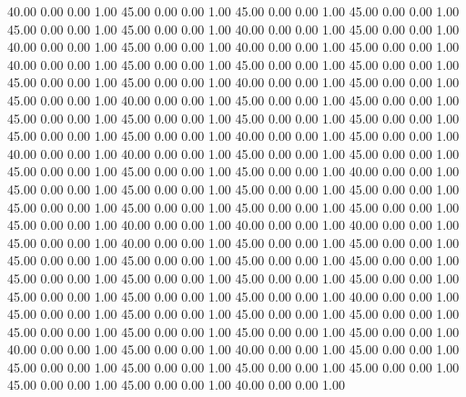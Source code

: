    40.00   0.00   0.00   1.00
   45.00   0.00   0.00   1.00
   45.00   0.00   0.00   1.00
   45.00   0.00   0.00   1.00
   45.00   0.00   0.00   1.00
   45.00   0.00   0.00   1.00
   40.00   0.00   0.00   1.00
   45.00   0.00   0.00   1.00
   40.00   0.00   0.00   1.00
   45.00   0.00   0.00   1.00
   40.00   0.00   0.00   1.00
   45.00   0.00   0.00   1.00
   40.00   0.00   0.00   1.00
   45.00   0.00   0.00   1.00
   45.00   0.00   0.00   1.00
   45.00   0.00   0.00   1.00
   45.00   0.00   0.00   1.00
   45.00   0.00   0.00   1.00
   40.00   0.00   0.00   1.00
   45.00   0.00   0.00   1.00
   45.00   0.00   0.00   1.00
   40.00   0.00   0.00   1.00
   45.00   0.00   0.00   1.00
   45.00   0.00   0.00   1.00
   45.00   0.00   0.00   1.00
   45.00   0.00   0.00   1.00
   45.00   0.00   0.00   1.00
   45.00   0.00   0.00   1.00
   45.00   0.00   0.00   1.00
   45.00   0.00   0.00   1.00
   40.00   0.00   0.00   1.00
   45.00   0.00   0.00   1.00
   40.00   0.00   0.00   1.00
   40.00   0.00   0.00   1.00
   45.00   0.00   0.00   1.00
   45.00   0.00   0.00   1.00
   45.00   0.00   0.00   1.00
   45.00   0.00   0.00   1.00
   45.00   0.00   0.00   1.00
   40.00   0.00   0.00   1.00
   45.00   0.00   0.00   1.00
   45.00   0.00   0.00   1.00
   45.00   0.00   0.00   1.00
   45.00   0.00   0.00   1.00
   45.00   0.00   0.00   1.00
   45.00   0.00   0.00   1.00
   45.00   0.00   0.00   1.00
   45.00   0.00   0.00   1.00
   45.00   0.00   0.00   1.00
   40.00   0.00   0.00   1.00
   40.00   0.00   0.00   1.00
   40.00   0.00   0.00   1.00
   45.00   0.00   0.00   1.00
   40.00   0.00   0.00   1.00
   45.00   0.00   0.00   1.00
   45.00   0.00   0.00   1.00
   45.00   0.00   0.00   1.00
   45.00   0.00   0.00   1.00
   45.00   0.00   0.00   1.00
   45.00   0.00   0.00   1.00
   45.00   0.00   0.00   1.00
   45.00   0.00   0.00   1.00
   45.00   0.00   0.00   1.00
   45.00   0.00   0.00   1.00
   45.00   0.00   0.00   1.00
   45.00   0.00   0.00   1.00
   45.00   0.00   0.00   1.00
   40.00   0.00   0.00   1.00
   45.00   0.00   0.00   1.00
   45.00   0.00   0.00   1.00
   45.00   0.00   0.00   1.00
   45.00   0.00   0.00   1.00
   45.00   0.00   0.00   1.00
   45.00   0.00   0.00   1.00
   45.00   0.00   0.00   1.00
   45.00   0.00   0.00   1.00
   40.00   0.00   0.00   1.00
   45.00   0.00   0.00   1.00
   40.00   0.00   0.00   1.00
   45.00   0.00   0.00   1.00
   45.00   0.00   0.00   1.00
   45.00   0.00   0.00   1.00
   45.00   0.00   0.00   1.00
   45.00   0.00   0.00   1.00
   45.00   0.00   0.00   1.00
   45.00   0.00   0.00   1.00
   40.00   0.00   0.00   1.00
